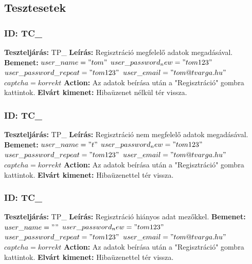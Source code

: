 \documentclass[12pt]{report}
\theoremstyle{definition}
\begin{document}
	
	\subsection{Tesztesetek}
	\setcounter{TPTCStart}{\value{TC}}
	
	\subsubsection{ID: TC\_}\addtocounter{TC}{1}
	\textbf{Teszteljárás:} TP\_
	\newline 
	\textbf{Leírás:} Regisztráció megfelelő adatok megadásával.
	\newline 
	\textbf{Bemenet:} $user\_name = "tom"$ $user\_password_new = "tom123"$ \linebreak$user\_password\_repeat = "tom123"$ $user\_email = "tom@tvarga.hu"$ $captcha = korrekt$
	\newline 
	\textbf{Action:} Az adatok beírása után a "Regisztráció" gombra kattintok.
	\newline 
	\textbf{Elvárt kimenet:} Hibaüzenet nélkül tér vissza.
	
	\subsubsection{ID: TC\_}\addtocounter{TC}{1}
	\textbf{Teszteljárás:} TP\_
	\newline 
	\textbf{Leírás:} Regisztráció nem megfelelő adatok megadásával.
	\newline 
	\textbf{Bemenet:} $user\_name = "t"$ $user\_password_new = "tom123"$ \linebreak$user\_password\_repeat = "tom123"$ $user\_email = "tom@tvarga.hu"$ $captcha = korrekt$
	\newline 
	\textbf{Action:} Az adatok beírása után a "Regisztráció" gombra kattintok.
	\newline 
	\textbf{Elvárt kimenet:} Hibaüzenettel tér vissza.
	
	\subsubsection{ID: TC\_}\addtocounter{TC}{1}
	\textbf{Teszteljárás:} TP\_
	\newline 
	\textbf{Leírás:} Regisztráció hiányos adat mezőkkel.
	\newline 
	\textbf{Bemenet:} $user\_name = ""$ $user\_password_new = "tom123"$ $user\_password\_repeat = "tom123"$ $user\_email = "tom@tvarga.hu"$ $captcha = korrekt$
	\newline 
	\textbf{Action:} Az adatok beírása után a "Regisztráció" gombra kattintok.
	\newline 
	\textbf{Elvárt kimenet:} Hibaüzenettel tér vissza.
	
\end{document}
